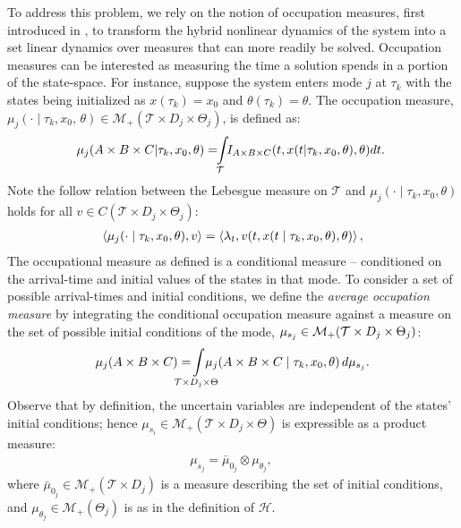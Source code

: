 To address this problem, we rely on the notion of occupation measures, first introduced in \cite{Pitman1977}, to transform the hybrid nonlinear dynamics of the system into a set linear dynamics over measures that can more readily be solved.
Occupation measures can be interested as measuring the time a solution spends in a portion of the state-space. 
For instance, suppose the system enters mode $j$ at $\tau_k$ with the states being initialized as $x(\tau_k)=x_0$ and $\theta(\tau_k)=\theta$.
The occupation measure, \mbox{$\mu_j(\cdot\mid \tau_k,x_0,\,\theta)\in \mathcal M_+(\mathcal T\times D_j\times \Theta_j)$}, is defined as:
\small
\begin{align}
\hspace*{-1mm}\mu_j(A\times B\times C| \tau_k ,x_0,\theta)=\hspace*{-1.25mm}\int\limits_{\cal T} \hspace*{-1.25mm} I_{A\times B\times C}(t,x(t|\tau_k,x_0,\theta),\theta)dt.
\end{align}
\normalsize
Note the follow relation between the Lebesgue measure on $\mathcal T$ and $\mu_j(\cdot\mid \tau_k,x_0,\theta)$ holds for all $v \in C(\mathcal T\times D_j\times \Theta_j)$:
\begin{align}
\left\langle \mu_j(\cdot\mid \tau_k,x_0,\theta),v\right\rangle=\left\langle \lambda_t,v(t,x(t\mid \tau_k,x_0,\theta),\theta)\right\rangle,
\label{eq:mu_lambda}
\end{align}
The occupational measure as defined is a conditional measure -- conditioned on the arrival-time and initial values of the states in that mode.
To consider a set of possible arrival-times and initial conditions, we define the \emph{average occupation measure} by integrating the conditional occupation measure against a measure on the set of possible initial conditions of the mode, $\mu_{s_j} \in  {\cal M}_+(\mathcal T\times D_j\times \Theta_j)$:
\begin{align}
\mu_j(A\times B\times C)= \hspace*{-5mm}\int\limits_{\mathcal T\times D_j\times \Theta}\hspace*{-5mm}\mu_j(A\times B\times C\mid \tau_k,x_0,\theta)\,d \mu_{s_j}.
\label{eq:mu_avg}
\end{align}
Observe that by definition, the uncertain variables are independent of the states' initial conditions; hence $\mu_{s_i}\in \mathcal M_+(\mathcal T\times D_j\times \Theta)$ is expressible as a product measure:
\begin{align}
\mu_{s_j}=\bar\mu_{0_j}\otimes \mu_{\theta_j},\
\end{align}
where $\bar \mu_{0_j}\in \mathcal M_+(\mathcal T\times D_j)$ is a measure describing the set of initial conditions, and $\mu_{\theta_j}\in \mathcal M_+(\Theta_j)$ is as in the definition of $\mathcal H$.

